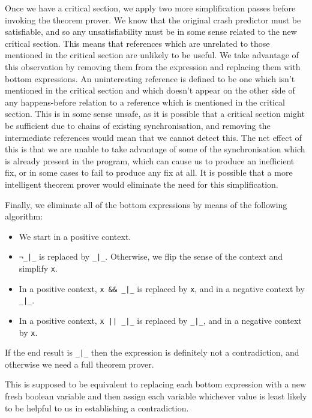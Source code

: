 \documentclass[10pt,a4paper,twocolumn]{article}
\begin{document}
Once we have a critical section, we apply two more simplification
passes before invoking the theorem prover.  We know that the original
crash predictor must be satisfiable, and so any unsatisfiability must
be in some sense related to the new critical section.  This means that
references which are unrelated to those mentioned in the critical
section are unlikely to be useful.  We take advantage of this
observation by removing them from the expression and replacing them
with bottom expressions.  An uninteresting reference is defined to be
one which isn't mentioned in the critical section and which doesn't
appear on the other side of any happens-before relation to a reference
which is mentioned in the critical section.  This is in some sense
unsafe, as it is possible that a
critical section might be sufficient due to chains of existing
synchronisation, and removing the intermediate references would mean
that we cannot detect this.  The net effect of this is that we are
unable to take advantage of some of the synchronisation which is
already present in the program, which can cause us to produce an
inefficient fix, or in some cases to fail to produce any fix at all.
It is possible that a more intelligent theorem prover would eliminate
the need for this simplification.

Finally, we eliminate all of the bottom expressions by means of the
following algorithm:

\begin{itemize}
\item We start in a positive context.
\item \verb^¬_|_^ is replaced by \verb^_|_^.  Otherwise, we flip the
  sense of the context and simplify \verb|x|.
\item In a positive context, \verb^x && _|_^ is replaced by \verb|x|,
  and in a negative context by \verb^_|_^.
\item In a positive context, \verb^x || _|_^ is replaced by
  \verb^_|_^, and in a negative context by \verb^x^.
\end{itemize}

If the end result is \verb^_|_^ then the expression is definitely not
a contradiction, and otherwise we need a full theorem prover.

This is supposed to be equivalent to replacing each bottom expression
with a new fresh boolean variable and then assign each variable
whichever value is least likely to be helpful to us in establishing a
contradiction.
\end{document}
